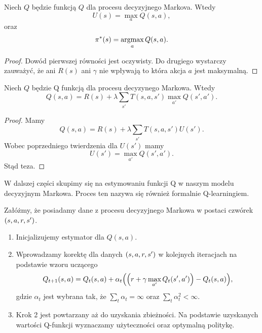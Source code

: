 \documentclass[10pt,a4paper]{book}
\newcommand{\argmax}{\operatornamewithlimits{argmax}}
\begin{document}
\begin{theorem}
Niech $Q$ będzie funkcją $Q$ dla procesu decyzyjnego Markova. Wtedy
$$
U(s) = \max_{a} Q(s,a),
$$
oraz 
$$
\pi^\ast(s) = \argmax_{a} Q(s,a).
$$
\end{theorem}

\begin{proof}
Dowód pierwszej równości jest oczywisty. Do drugiego wystarczy zauważyć, że ani $R(s)$ ani $\gamma$ nie wpływają to która akcja $a$ jest maksymalną.
\end{proof}

\begin{theorem}
Niech $Q$ będzie Q funkcją dla procesu decyzynego Markowa. Wtedy 
$$
Q(s,a) = R(s) + \lambda \sum_{s'} T(s,a,s') \max_{a'} Q(s',a').
$$
\end{theorem}

\begin{proof}
Mamy 
$$
Q(s,a) = R(s) + \lambda \sum_{s'} T(s,a,s') U(s').
$$
Wobec poprzedniego twierdzenia dla $U(s')$ mamy
$$
U(s') = \max_{a'} Q(s',a').
$$
Stąd teza.

\end{proof}

W dalszej części skupimy się na estymowaniu funkcji Q w naszym modelu decyzyjnym Markowa. Proces ten nazywa się również formalnie Q-learningiem.

\begin{definition}
Załóżmy, że posiadamy dane z procesu decyzyjnego Markowa w postaci czwórek $\left( {s,a,r,s'} \right)$. 
\begin{enumerate}
\item Inicjalizujemy estymator dla $Q(s,a)$. 
\item Wprowadzamy korektę dla danych $\left( {s,a,r,s'} \right)$ w kolejnych iteracjach na podstawie wzoru uczącego
$$
Q_{t+1}(s,a) = Q_{t}(s,a) + \alpha_t {\left( { {\left( {r + \gamma \max_{a'} Q_{t}(s',a')} \right)} - Q_{t}(s,a)} \right)},
$$
gdzie $\alpha_t$ jest wybrana tak, że $\sum_{t} \alpha_t = \infty$ oraz $\sum_{t} \alpha_t^2 < \infty$.
\item Krok 2 jest powtarzany aż do uzyskania zbieżności. Na podstawie uzyskanych wartości Q-funkcji wyznaczamy użyteczności oraz optymalną politykę.
\end{enumerate}

\end{definition}

\printindex



\end{document}
